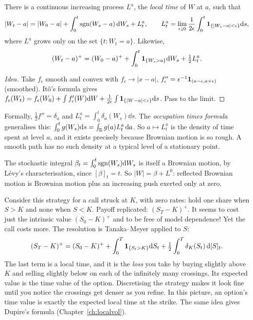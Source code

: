 \begin{theorem}[Tanaka]\label{thm:tanaka}
There is a continuous increasing process $L^a$, the \emph{local time} of $W$ at $a$, such that
\[
|W_t-a|=|W_0-a|+\int_0^t\operatorname{sgn}(W_s-a)\,\mathrm{d} W_s+L^a_t,\qquad L^a_t=\lim_{\epsilon\downarrow0}\frac1{2\epsilon}\int_0^t\mathbf{1}_{\{|W_s-a|<\epsilon\}}\mathrm{d} s,
\]
where $L^a$ grows only on the set $\{t:W_t=a\}$. Likewise,
\[
(W_t-a)^+=(W_0-a)^++\int_0^t\mathbf{1}_{\{W_s>a\}}\mathrm{d} W_s+\tfrac12L^a_t.
\]
\end{theorem}
\begin{proof}[Idea]
Take $f_\epsilon$ smooth and convex with $f_\epsilon\to|x-a|$, $f_\epsilon''=\epsilon^{-1}\mathbf{1}_{(a-\epsilon,a+\epsilon)}$ (smoothed). It\^o's formula gives $f_\epsilon(W_t)=f_\epsilon(W_0)+\int f_\epsilon'(W)\mathrm{d} W+\frac1{2\epsilon}\int\mathbf{1}_{\{|W-a|<\epsilon\}}\mathrm{d} s$. Pass to the limit.
\end{proof}

Formally, $\tfrac12f''=\delta_a$ and $L^a_t=\int_0^t\delta_a(W_s)\dd s$. The \emph{occupation times formula} generalises this: $\int_0^tg(W_s)\mathrm{d} s=\int_{\mathbb{R}} g(a)L^a_t\,\mathrm{d} a$. So $a\mapsto L^a_t$ is the density of time spent at level $a$, and it exists precisely because Brownian motion is so rough. A smooth path has no such density at a typical level of a stationary point.

The stochastic integral $\beta_t=\int_0^t\operatorname{sgn}(W_s)\mathrm{d} W_s$ is itself a Brownian motion, by L\'evy's characterisation, since $[\beta]_t=t$. So $|W|=\beta+L^0$: reflected Brownian motion is Brownian motion plus an increasing push exerted only at zero.

\begin{example}\label{ex:stoploss}
Consider this strategy for a call struck at $K$, with zero rates: hold one share when $S>K$ and none when $S<K$. Payoff replicated: $(S_T-K)^+$. It seems to cost just the intrinsic value $(S_0-K)^+$ and to be free of model dependence! Yet the call costs more. The resolution is Tanaka--Meyer applied to $S$:
\[
(S_T-K)^+=(S_0-K)^++\int_0^T\mathbf{1}_{\{S_t>K\}}\mathrm{d} S_t+\tfrac12\int_0^T\delta_K(S_t)\,\mathrm{d}[S]_t.
\]
The last term is a local time, and it is the \emph{loss} you take by buying slightly above $K$ and selling slightly below on each of the infinitely many crossings. Its expected value is the time value of the option. Discretising the strategy makes it look fine until you notice the crossings get denser as you refine. In this picture, an option's time value is exactly the expected local time at the strike. The same idea gives Dupire's formula (Chapter~\ref{ch:localvol}).
\end{example}

